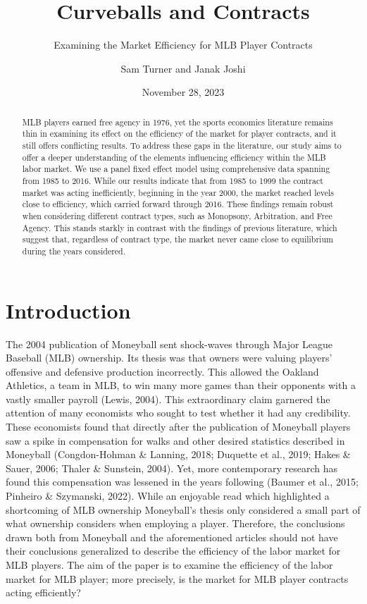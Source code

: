 \documentclass[
  12pt,
  letterpaper,
  DIV=11,
  numbers=noendperiod]{scrartcl}
\title{Curveballs and Contracts}
\subtitle{Examining the Market Efficiency for MLB Player Contracts}
\author{Sam Turner and Janak Joshi}
\date{November 28, 2023}
\begin{document}
\maketitle
\begin{abstract}
\doublespacing
MLB players earned free agency in 1976, yet the sports economics
literature remains thin in examining its effect on the efficiency of the
market for player contracts, and it still offers conflicting results. To
address these gaps in the literature, our study aims to offer a deeper
understanding of the elements influencing efficiency within the MLB
labor market. We use a panel fixed effect model using comprehensive data
spanning from 1985 to 2016. While our results indicate that from 1985 to
1999 the contract market was acting inefficiently, beginning in the year
2000, the market reached levels close to efficiency, which carried
forward through 2016. These findings remain robust when considering
different contract types, such as Monopsony, Arbitration, and Free
Agency. This stands starkly in contrast with the findings of previous
literature, which suggest that, regardless of contract type, the market
never came close to equilibrium during the years considered.
\end{abstract}
\ifdefined\Shaded\renewenvironment{Shaded}{\begin{tcolorbox}[borderline west={3pt}{0pt}{shadecolor}, boxrule=0pt, breakable, interior hidden, frame hidden, sharp corners, enhanced]}{\end{tcolorbox}}\fi

\hypertarget{sec-Introduction}{%
\section{Introduction}\label{sec-Introduction}}

The 2004 publication of Moneyball sent shock-waves through Major League
Baseball (MLB) ownership. Its thesis was that owners were valuing
players' offensive and defensive production incorrectly. This allowed
the Oakland Athletics, a team in MLB, to win many more games than their
opponents with a vastly smaller payroll (Lewis, 2004). This
extraordinary claim garnered the attention of many economists who sought
to test whether it had any credibility. These economists found that
directly after the publication of Moneyball players saw a spike in
compensation for walks and other desired statistics described in
Moneyball (Congdon-Hohman \& Lanning, 2018; Duquette et al., 2019; Hakes
\& Sauer, 2006; Thaler \& Sunstein, 2004). Yet, more contemporary
research has found this compensation was lessened in the years following
(Baumer et al., 2015; Pinheiro \& Szymanski, 2022). While an enjoyable
read which highlighted a shortcoming of MLB ownership Moneyball's thesis
only considered a small part of what ownership considers when employing
a player. Therefore, the conclusions drawn both from Moneyball and the
aforementioned articles should not have their conclusions generalized to
describe the efficiency of the labor market for MLB players. The aim of
the paper is to examine the efficiency of the labor market for MLB
player; more precisely, is the market for MLB player contracts acting
efficiently?
\end{document}
